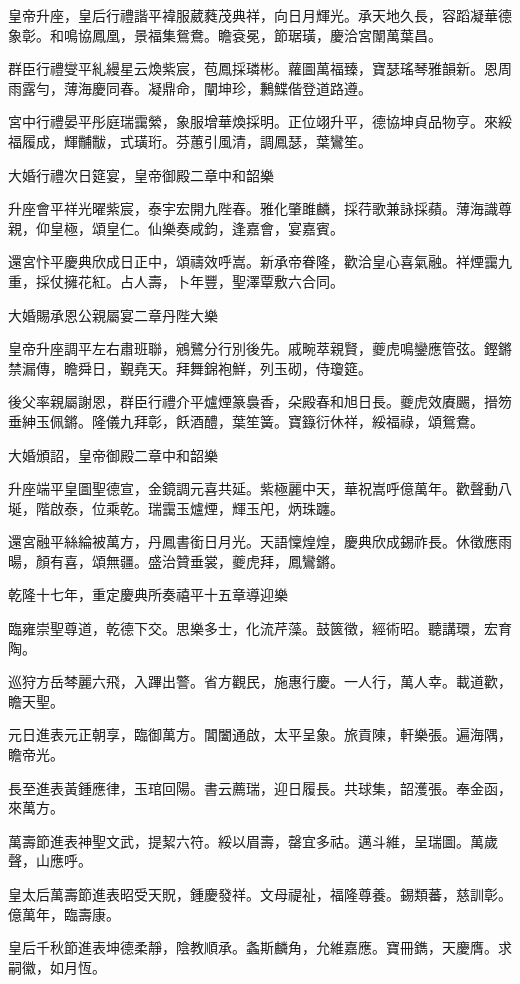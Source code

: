 \begin{pinyinscope}
皇帝升座，皇后行禮諧平褘服葳蕤茂典祥，向日月輝光。承天地久長，容蹈凝華德象彰。和鳴協鳳凰，景福集鴛鴦。瞻袞冕，節琚璜，慶洽宮闈萬葉昌。

群臣行禮燮平糺縵星云煥紫宸，苞鳳採璘彬。蘿圖萬福臻，寶瑟瑤琴雅韻新。恩周雨露勻，薄海慶同春。凝鼎命，闡坤珍，鶼鰈偕登道路遵。

宮中行禮晏平彤庭瑞靄縈，象服增華煥採明。正位翊升平，德協坤貞品物亨。來綏福履成，輝黼黻，式璜珩。芬蕙引風清，調鳳瑟，葉鸞笙。

大婚行禮次日筵宴，皇帝御殿二章中和韶樂

升座會平祥光曜紫宸，泰宇宏開九陛春。雅化肇雎麟，採荇歌兼詠採蘋。薄海識尊親，仰皇極，頌皇仁。仙樂奏咸鈞，逢嘉會，宴嘉賓。

還宮忭平慶典欣成日正中，頌禱效呼嵩。新承帝眷隆，歡洽皇心喜氣融。祥煙靄九重，採仗擁花紅。占人壽，卜年豐，聖澤覃敷六合同。

大婚賜承恩公親屬宴二章丹陛大樂

皇帝升座調平左右肅班聯，鵷鷺分行別後先。戚畹萃親賢，夔虎鳴鑾應管弦。鏗鏘禁漏傳，瞻舜日，覲堯天。拜舞錦袍鮮，列玉砌，侍瓊筵。

後父率親屬謝恩，群臣行禮介平爐煙篆裊香，朵殿春和旭日長。夔虎效賡颺，搢笏垂紳玉佩鏘。隆儀九拜彰，飫酒醴，葉笙簧。寶籙衍休祥，綏福祿，頌鴛鴦。

大婚頒詔，皇帝御殿二章中和韶樂

升座端平皇圖聖德宣，金鏡調元喜共延。紫極麗中天，華祝嵩呼億萬年。歡聲動八埏，階啟泰，位乘乾。瑞靄玉爐煙，輝玉戺，炳珠躔。

還宮融平絲綸被萬方，丹鳳書銜日月光。天語懍煌煌，慶典欣成錫祚長。休徵應雨暘，顏有喜，頌無疆。盛治贊垂裳，夔虎拜，鳳鸞鏘。

乾隆十七年，重定慶典所奏禧平十五章導迎樂

臨雍崇聖尊道，乾德下交。思樂多士，化流芹藻。鼓篋徵，經術昭。聽講環，宏育陶。

巡狩方岳棽麗六飛，入蹕出警。省方觀民，施惠行慶。一人行，萬人幸。載道歡，瞻天聖。

元日進表元正朝享，臨御萬方。閶闔通啟，太平呈象。旅貢陳，軒樂張。遍海隅，瞻帝光。

長至進表黃鍾應律，玉琯回陽。書云薦瑞，迎日履長。共球集，韶濩張。奉金函，來萬方。

萬壽節進表神聖文武，提絜六符。綏以眉壽，罄宜多祜。邁斗維，呈瑞圖。萬歲聲，山應呼。

皇太后萬壽節進表昭受天貺，鍾慶發祥。文母禔祉，福隆尊養。錫類蕃，慈訓彰。億萬年，臨壽康。

皇后千秋節進表坤德柔靜，陰教順承。螽斯麟角，允維嘉應。寶冊鐫，天慶膺。求嗣徽，如月恆。


\end{pinyinscope}

